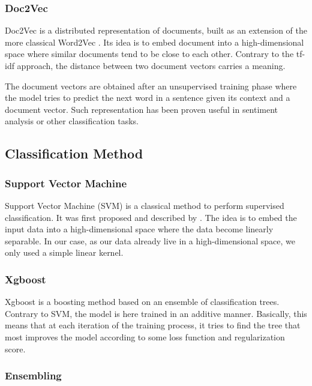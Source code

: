 \documentclass[11pt,twocolumn,letterpaper]{article}
\begin{document}
\subsubsection{Doc2Vec}

Doc2Vec \cite{le2014distributed} is a distributed representation of documents, built as an extension of the more classical Word2Vec \cite{mikolov2013distributed}. Its idea is to embed document into a high-dimensional space where similar documents tend to be close to each other. Contrary to the tf-idf approach, the distance between two document vectors carries a meaning.

The document vectors are obtained after an unsupervised training phase where the model tries to predict the next word in a sentence given its context and a document vector. Such representation has been proven useful in sentiment analysis or other classification tasks.

\subsection{Classification Method}

\subsubsection{Support Vector Machine}

Support Vector Machine (SVM) is a classical method to perform supervised classification. It was first proposed and described by \cite{Cortes1995}. The idea is to embed the input data into a high-dimensional space where the data become linearly separable. In our case, as our data already live in a high-dimensional space, we only used a simple linear kernel.

\subsubsection{Xgboost}

Xgboost \cite{chen2016xgboost} is a boosting method based on an ensemble of classification trees. Contrary to SVM, the model is here trained in an additive manner. Basically, this means that at each iteration of the training process, it tries to find the tree that most improves the model according to some loss function and regularization score.

\subsubsection{Ensembling}
\end{document}

